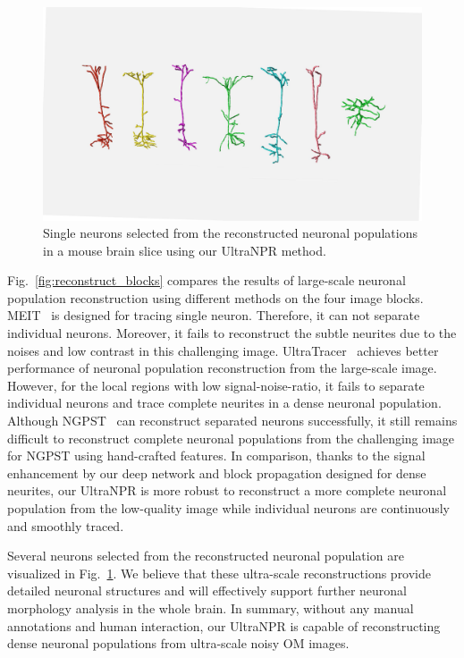 \begin{figure}[t]
	\centering
	\includegraphics[width=\columnwidth]{./Illustrations/single_neurons4.pdf}
	\caption{Single neurons selected from the reconstructed neuronal populations in a mouse brain slice using our UltraNPR method.}
	\label{fig:single_neurons}
\end{figure}

Fig.~\ref{fig:reconstruct_blocks} compares the results of large-scale neuronal population reconstruction using different methods on the four image blocks. 
%
MEIT~\cite{Wang2018} is designed for tracing single neuron. Therefore, it can not separate individual neurons. 
Moreover, it fails to reconstruct the subtle neurites due to the noises and low contrast in this challenging image.
UltraTracer~\cite{Peng2017} achieves better performance of neuronal population reconstruction from the large-scale image. 
However, for the local regions with low signal-noise-ratio, it fails to separate individual neurons and trace complete neurites in a dense neuronal population.
Although NGPST~\cite{Quan2015} can reconstruct separated neurons successfully, it still remains difficult to reconstruct complete neuronal populations from the challenging image for NGPST using hand-crafted features.
In comparison, thanks to the signal enhancement by our deep network and block propagation designed for dense neurites, our UltraNPR is more robust to reconstruct a more complete neuronal population from the low-quality image while individual neurons are continuously and smoothly traced.



Several neurons selected from the reconstructed neuronal population are visualized in Fig.~\ref{fig:single_neurons}. 
We believe that these ultra-scale reconstructions provide detailed neuronal structures and will effectively support further neuronal morphology analysis in the whole brain. 
In summary, without any manual annotations and human interaction, our UltraNPR is capable of reconstructing dense neuronal populations from ultra-scale noisy OM images. 
